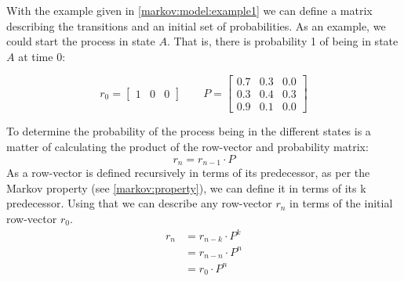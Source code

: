 With the example given in \cref{markov:model:example1} we can define a matrix describing the transitions and an initial set of probabilities.
As an example, we could start the process in state $A$.
That is, there is probability 1 of being in state $A$ at time 0:

\begin{equation}\label{markov:model:example1:initial}
r_0 = \begin{bmatrix} 1 & 0 & 0 \end{bmatrix}
\quad\quad
P = \begin{bmatrix}
       0.7 & 0.3 & 0.0 \\[0.3em]
       0.3 & 0.4 & 0.3 \\[0.3em]
       0.9 & 0.1 & 0.0
     \end{bmatrix}
\end{equation}

To determine the probability of the process being in the different states is a matter of calculating the product of the row-vector and probability matrix:
$$r_n = r_{n-1} \cdot P$$
As a row-vector is defined recursively in terms of its predecessor, as per the Markov property (see \cref{markov:property}), we can define it in terms of its k predecessor.
Using that we can describe any row-vector $r_n$ in terms of the initial row-vector $r_0$.
\begin{align}
r_n &= r_{n-k} \cdot P^k\\
    &= r_{n - n} \cdot P^n\nonumber\\
    &= r_0 \cdot P^n\nonumber
\end{align}

